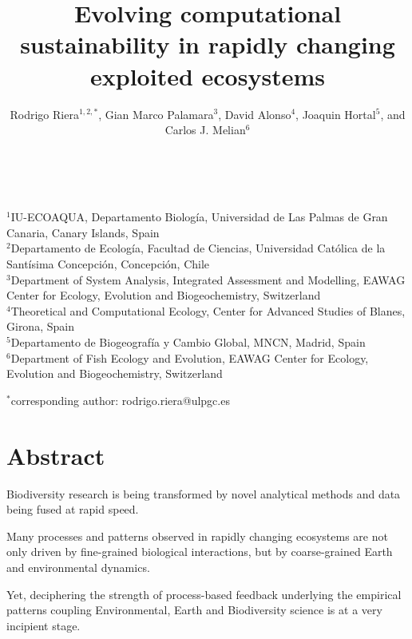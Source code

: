 \documentclass[12pt,a4paper]{article}
\begin{document}
\title{Evolving computational sustainability in rapidly changing exploited ecosystems}

\maketitle
\noindent \author{Rodrigo Riera$^{1,2,*}$, Gian Marco Palamara${^3}$, David Alonso${^4}$, Joaqu\´in Hortal${^5}$, and Carlos J. Meli\´an${^6}$}
            \\
            \vspace{0.25 in}
            
  \noindent  $^{1}$IU-ECOAQUA, Departamento Biolog\'ia, Universidad de Las Palmas de Gran Canaria, Canary Islands, Spain\\
  $^{2}$Departamento de Ecolog\'ia, Facultad de Ciencias, Universidad Cat\'olica de la Sant\'isima Concepci\'on, Concepci\'on, Chile\\
  $^{3}$Department of System Analysis, Integrated Assessment and Modelling, EAWAG Center for Ecology, Evolution and Biogeochemistry, Switzerland\\
  $^{4}$Theoretical and Computational Ecology, Center for Advanced Studies of Blanes, Girona, Spain\\
  $^{5}$Departamento de Biogeograf\'ia y Cambio Global, MNCN, Madrid, Spain\\
  $^{6}$Department of Fish Ecology and Evolution, EAWAG Center for Ecology, Evolution and Biogeochemistry, Switzerland\\
\vspace{0.25 in}

  $^{*}$corresponding author: rodrigo.riera@ulpgc.es

\newpage
\section{Abstract}
Biodiversity research is being transformed by novel analytical methods and data being fused at rapid
speed. 

Many processes and patterns observed in rapidly changing ecosystems are not only driven by fine-grained biological interactions, but by coarse-grained Earth and environmental dynamics. 

Yet, deciphering the strength of process-based feedback underlying the empirical patterns coupling Environmental, Earth and Biodiversity science is at a very incipient stage. 
\end{document}
